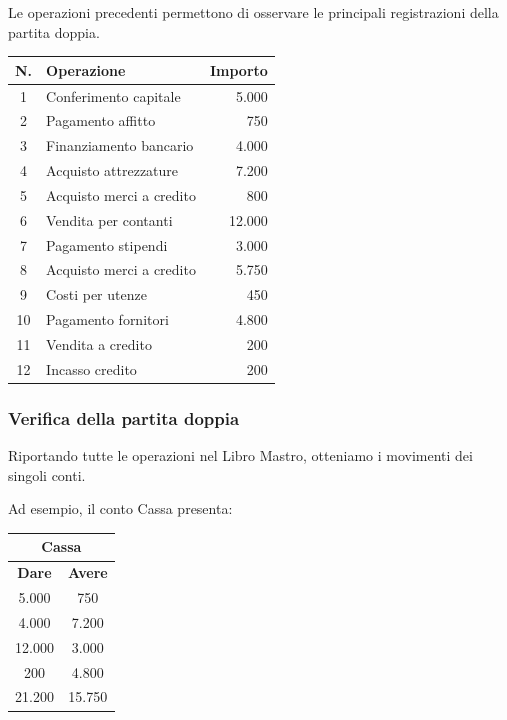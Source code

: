 \noindent Le operazioni precedenti permettono
di osservare le principali registrazioni
della partita doppia.

\begin{center}
\small
\begin{tabular}{|c|l|r|}
\hline
\textbf{N.} & \textbf{Operazione} & \textbf{Importo} \\
\hline
1 & Conferimento capitale & 5.000 \\
\hline
2 & Pagamento affitto & 750 \\
\hline
3 & Finanziamento bancario & 4.000 \\
\hline
4 & Acquisto attrezzature & 7.200 \\
\hline
5 & Acquisto merci a credito & 800 \\
\hline
6 & Vendita per contanti & 12.000 \\
\hline
7 & Pagamento stipendi & 3.000 \\
\hline
8 & Acquisto merci a credito & 5.750 \\
\hline
9 & Costi per utenze & 450 \\
\hline
10 & Pagamento fornitori & 4.800 \\
\hline
11 & Vendita a credito & 200 \\
\hline
12 & Incasso credito & 200 \\
\hline
\end{tabular}
\end{center}


\subsubsection*{Verifica della partita doppia}

\noindent Riportando tutte le operazioni
nel Libro Mastro, otteniamo i movimenti
dei singoli conti.

\medskip

\noindent Ad esempio, il conto Cassa presenta:

\begin{center}
\begin{tabular}{c|c}
\multicolumn{2}{c}{\textbf{Cassa}} \\
\hline
\textbf{Dare} & \textbf{Avere} \\
\hline
5.000 & 750 \\
4.000 & 7.200 \\
12.000 & 3.000 \\
200 & 4.800 \\
\hline
21.200 & 15.750 \\
\end{tabular}
\end{center}

